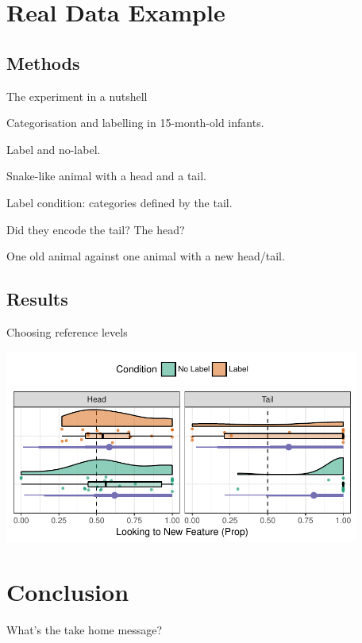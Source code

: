 \documentclass{beamer}
\begin{document}
\section{Real Data Example}

\subsection{Methods}

\begin{frame}{The experiment in a nutshell}

  Categorisation and labelling in 15-month-old infants.
  \vspace{2em}
  \begin{description}
    \pause\item[\hspace{37.5pt}Conditions] Label and no-label.
    \pause\item[\hspace{20pt}Familiarisation] Snake-like animal with a head and a tail.
    
    Label condition: categories defined by the tail.
    \pause\item[Novelty Preference] Did they encode the tail? The head?
    
    One old animal against one animal with a new head/tail.
  \end{description}

\end{frame}

\subsection{Results}

\begin{frame}{Choosing reference levels}

  \begin{center}
    \includegraphics[height=2.5in]{SalDi-old_new.pdf}
  \end{center}

\end{frame}

\section{Conclusion}

\begin{frame}{What's the take home message?}

\end{frame}
\end{document}
